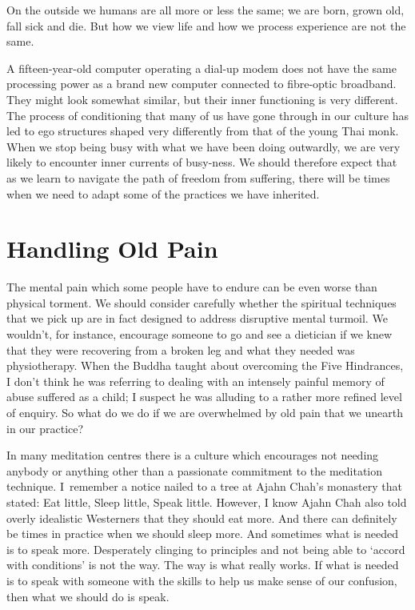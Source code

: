 \enlargethispage{\baselineskip}

On the outside we humans are all more or less the same; we are born,
grown old, fall sick and die. But how we view life and how we process
experience are not the same.

A fifteen-year-old computer operating a
dial-up modem does not have the same processing power as a brand new
computer connected to fibre-optic broadband. They might look somewhat
similar, but their inner functioning is very different. The process of
conditioning that many of us have gone through in our culture has led to
ego structures shaped very differently from that of the young Thai monk.
When we stop being busy with what we have been doing outwardly, we are
very likely to encounter inner currents of busy-ness. We should
therefore expect that as we learn to navigate the path of freedom from
suffering, there will be times when we need to adapt some of the
practices we have inherited.

\section{Handling Old Pain}

The mental pain which some people have to endure can be even worse than
physical torment. We should consider carefully whether the spiritual
techniques that we pick up are in fact designed to address disruptive
mental turmoil. We wouldn't, for instance, encourage someone to go and
see a dietician if we knew that they were recovering from a broken leg
and what they needed was physiotherapy. When the Buddha taught about
overcoming the Five Hindrances,\cite{hindrances} I don't think he was referring
to dealing with an intensely painful memory of abuse suffered as a
child; I suspect he was alluding to a rather more refined level of
enquiry. So what do we do if we are overwhelmed by old pain that we
unearth in our practice?

In many meditation centres there is a culture which encourages not
needing anybody or anything other than a passionate commitment to the
meditation technique. I~remember a notice nailed to a tree at Ajahn
Chah's monastery that stated: Eat little, Sleep little, Speak little.
However, I know Ajahn Chah also told overly idealistic Westerners that
they should eat more. And there can definitely be times in practice when
we should sleep more. And sometimes what is needed is to speak more.
Desperately clinging to principles and not being able to `accord with
conditions' is not the way. The way is what really works. If what is
needed is to speak with someone with the skills to help us make sense of
our confusion, then what we should do is speak.

